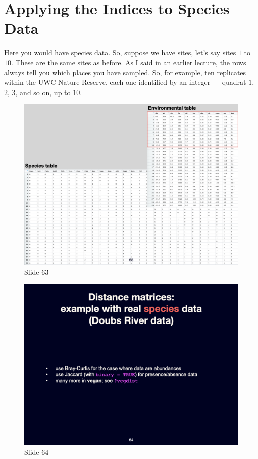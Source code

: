 \documentclass[
  10pt,
]{book}
\begin{document}
\section{Applying the Indices to Species
Data}\label{applying-the-indices-to-species-data}

Here you would have species data. So, suppose we have sites, let's say
sites \(1\) to \(10\). These are the same sites as before. As I said in
an earlier lecture, the rows always tell you which places you have
sampled. So, for example, ten replicates within the UWC Nature Reserve,
each one identified by an integer --- quadrat \(1\), \(2\), \(3\), and
so on, up to \(10\).

\begin{figure}[ht]
\centering
\includegraphics[width=0.8\linewidth]{../images/BDC334/BDC334-063.jpeg}
\caption*{Slide 63}
\end{figure}

\begin{figure}[ht]
\centering
\includegraphics[width=0.8\linewidth]{../images/BDC334/BDC334-064.jpeg}
\caption*{Slide 64}
\end{figure}
\end{document}
